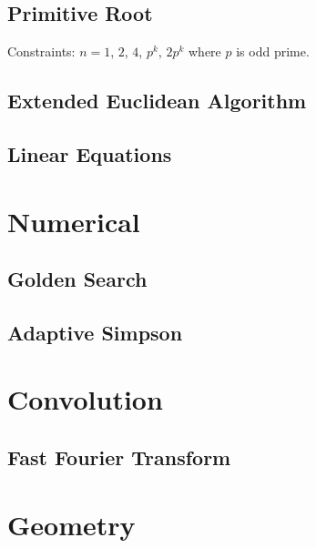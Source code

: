 \documentclass{article}
\begin{document}
\begin{multicols}{2}
    \subsection{Primitive Root}
    Constraints: $n=1$, $2$, $4$, $p^k$, $2p^{k}$ where $p$ is odd prime.
    
    \subsection{Extended Euclidean Algorithm}
    
    \subsection{Linear Equations}
    
    
    \section{Numerical}
    \subsection{Golden Search}
    
    \subsection{Adaptive Simpson}
    

    \section{Convolution}
    \subsection{Fast Fourier Transform}
    

    \section{Geometry}
\end{multicols}
\end{document}
